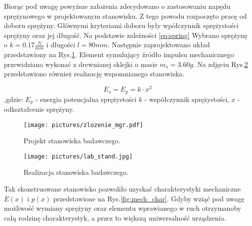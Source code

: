 \indent %
Biorąc pod uwagę powyższe założenia zdecydowano o zastosowaniu napędu sprężynowego w projektowanym stanowisku. Z tego powodu rozpoczęto pracę od doboru sprężyny. Głównymi kryteriami doboru były wpółczynnik sprężystości sprężyny oraz jej długość. Na podstawie zależności \ref{eq:spring} Wybrano sprężynę o $k=0.17\frac{N}{mm}$ i długości $l=80mm$. Następnie zaprojektowano
układ przedstawiony na Rys.\ref{fig:test_stand}. Element symulujący źródło impulsu mechanicznego przewidziano wykonać z drewnianej sklejki o masie $m_s = 3.60g$. Na zdjęciu Rys.\ref{fig:test_stand_photo} przedstawiono również realizację wspomnianego stanowiska.

\begin{equation}
E_s = E_p = k \cdot x^2
\label{eq:spring}
\end{equation}
,gdzie: $E_p$ - energia potencjalna sprężystości $k$ - współczynnik sprężystości, $x$ - odkształcenie sprężyny.


\begin{figure}[htbp]
\centering
\texttt{[image: pictures/zlozenie\_mgr.pdf]}
\caption{Projekt stanowiska badawczego.}
\label{fig:test_stand}
\end{figure}

\begin{figure}[htbp]
\centering
\texttt{[image: pictures/lab\_stand.jpg]}
\caption{Realizacja stanowiska badawczego.}
\label{fig:test_stand_photo}
\end{figure}

Tak skonstruowane stanowisko pozwoliło uzyskać charakterystyki mechaniczne $E(x)$ i $p(x)$ przedstawione na Rys.\ref{fig:mech_char}. Gdyby wziąć pod uwagę możliwość wymiany sprężyny oraz elementu wprawianego w ruch otrzymanoby całą rodzinę charakterystyk, a przez to większą uniwersalność urządzenia.

\pgfplotsset{width=\linewidth,compat=1.3}



